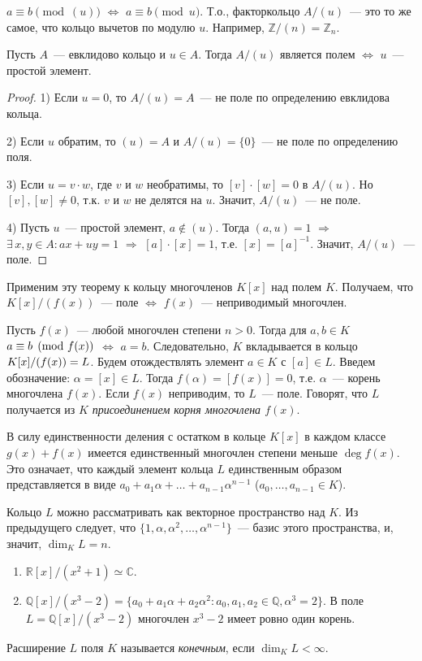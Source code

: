 \documentclass[a4paper]{article}
\newcommand*{\p}[1]{#1\nobreak\discretionary{}{\hbox{$\mathsurround=0pt #1$}}{}}
\begin{document}
$a\equiv b\pmod{(u)}$ $\Leftrightarrow$ $a\equiv b\pmod{u}$. Т.о.,
факторкольцо $A/(u)$~--- это то же самое, что кольцо вычетов по
модулю $u$. Например, $\mathbb{Z}/(n)=\mathbb{Z}_n$.

\begin{theorem}
Пусть $A$~--- евклидово кольцо и $u\in A$. Тогда $A/(u)$ является
полем $\Leftrightarrow$ $u$~--- простой элемент.
\end{theorem}

\begin{proof}
1) Если $u=0$, то $A/(u)=A$~--- не поле по определению евклидова
кольца.

2) Если $u$ обратим, то $(u)=A$ и $A/(u)=\{0\}$~--- не поле по
определению поля.

3) Если $u=v\cdot w$, где $v$ и $w$ необратимы, то $[v]\cdot[w]=0$ в
$A/(u)$. Но $[v],[w]\neq0$, т.к. $v$ и $w$ не делятся на $u$.
Значит, $A/(u)$~--- не поле.

4) Пусть $u$~--- простой элемент, $a\notin(u)$. Тогда $(a,u)=1$
$\Rightarrow$ $\exists \, x,y\in A: ax+uy=1$ $\Rightarrow$
$[a]\cdot[x]=1$, т.е. $[x]=[a]^{-1}$. Значит, $A/(u)$~--- поле.
\end{proof}

Применим эту теорему к кольцу многочленов $K[x]$ над полем $K$.
Получаем, что $K[x]/(f(x))$~--- поле $\Leftrightarrow$ $f(x)$~---
неприводимый многочлен.

Пусть $f(x)$~--- любой многочлен степени $n>0$. Тогда для $a,b\in K$
$a\p\equiv b\pmod{f(x)}$ $\Leftrightarrow$ $a=b$. Следовательно, $K$
вкладывается в кольцо $K[x]/(f(x))\p=L$. Будем отождествлять элемент
$a\in K$ с $[a]\in L$. Введем обозначение: $\alpha=[x]\in L$. Тогда
$f(\alpha)=[f(x)]=0$, т.е. $\alpha$~--- корень многочлена $f(x)$.
Если $f(x)$ неприводим, то $L$~--- поле. Говорят, что $L$ получается
из $K$ \emph{присоединением корня многочлена $f(x)$}.

В силу единственности деления с остатком в кольце $K[x]$ в каждом
классе $g(x)+{f(x)}$ имеется единственный многочлен степени меньше
$\deg f(x)$. Это означает, что каждый элемент кольца $L$
единственным образом представляется в виде
$a_0+a_1\alpha+\ldots+a_{n-1}\alpha^{n-1}$ ($a_0,\ldots,a_{n-1}\in
K$).

Кольцо $L$ можно рассматривать как векторное пространство над $K$.
Из предыдущего следует, что
$\{1,\alpha,\alpha^2,\ldots,\alpha^{n-1}\}$~--- базис этого
пространства, и, значит, $\dim_K L=n$.

\begin{ex}
\begin{enumerate}
  \item $\mathbb{R}[x]/(x^2+1)\simeq \mathbb{C}$.
  \item $\mathbb{Q}[x]/(x^3-2)=\{a_0+a_1\alpha+a_2\alpha^2: a_0,a_1,a_2\in\mathbb{Q},
  \alpha^3=2\}$. В поле $L=\mathbb{Q}[x]/(x^3-2)$ многочлен $x^3-2$
  имеет ровно один корень.
\end{enumerate}
\end{ex}
Расширение $L$ поля $K$ называется \emph{конечным}, если
$\dim_KL<\infty$.
\end{document}
